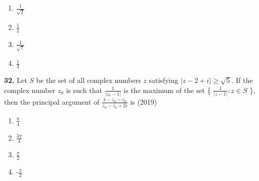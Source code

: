 \documentclass[journal,12pt,twocolumn]{IEEEtran}
\theoremstyle{remark}
\begin{document}
\begin{enumerate}[label=(\alph*)]
	\item $\frac{1}{\sqrt{2}}$
	\item $\frac{1}{2}$
	\item $\frac{1}{\sqrt{7}}$
	\item $\frac{1}{3}$
\end{enumerate}
\textbf{32.} Let $S$ be the set of all complex numbers $z$ satisfying $|z-2+i|\geq\sqrt{5}$. If the complex number $z_{0}$ is such that $\frac{1}{|z_{0}-1|}$ is the maximum of the set \{ $\frac{1}{|z-1|} : z \in S$ \}, then the principal argument of $\frac{4-z_{0}-\overline{z_{0}}}{z_{0}-\overline{z_{0}}+2i}$ is  \hfill{(2019)}
\begin{enumerate}[label=(\alph*)]
	\item $\frac{\pi}{4}$
	\item $\frac{3\pi}{4}$
	\item $\frac{\pi}{2}$
	\item -$\frac{\pi}{2}$
\end{enumerate}
\end{document}

